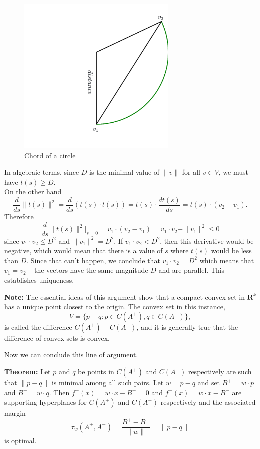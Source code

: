 \documentclass[
]{article}
\begin{document}
\begin{figure}
\hypertarget{fig:chord}{%
\centering
\includegraphics[width=3in,height=\textheight]{../img/chord2.png}
\caption{Chord of a circle}\label{fig:chord}
}
\end{figure}

In algebraic terms, since \(D\) is the minimal value of \(\|v\|\) for
all \(v\in V\), we must have \(t(s)\ge D\).\\
On the other hand \[
\frac{d}{ds}\|t(s)\|^2 = \frac{d}{ds}(t(s)\cdot t(s)) =t(s)\cdot \frac{dt(s)}{ds} = t(s)\cdot(v_2-v_1).
\] Therefore \[
\frac{d}{ds}\|t(s)\|^2|_{s=0} = v_{1}\cdot(v_{2}-v_{1})=v_{1}\cdot v_{2}-\|v_{1}\|^2\le 0
\] since \(v_{1}\cdot v_{2}\le D^{2}\) and \(\|v_{1}\|^2=D^2\). If
\(v_{1}\cdot v_{2}<D^{2}\), then this derivative would be negative,
which would mean that there is a value of \(s\) where \(t(s)\) would be
less than \(D\). Since that can't happen, we conclude that
\(v_{1}\cdot v_{2}=D^{2}\) which means that \(v_{1}=v_{2}\) -- the
vectors have the same magnitude \(D\) and are parallel. This establishes
uniqueness.

\textbf{Note:} The essential ideas of this argument show that a compact
convex set in \(\mathbf{R}^{k}\) has a unique point closest to the
origin. The convex set in this instance, \[
V=\{p-q:p\in C(A^{+}),q\in C(A^{-})\},
\] is called the difference \(C(A^{+})-C(A^{-})\), and it is generally
true that the difference of convex sets is convex.

Now we can conclude this line of argument.

\textbf{Theorem:} Let \(p\) and \(q\) be points in \(C(A^{+})\) and
\(C(A^{-})\) respectively are such that \(\|p-q\|\) is minimal among all
such pairs. Let \(w=p-q\) and set \(B^{+}=w\cdot p\) and
\(B^{-}=w\cdot q\). Then \(f^{+}(x)=w\cdot x-B^{+}=0\) and
\(f^{-}(x)=w\cdot x-B^{-}\) are supporting hyperplanes for \(C(A^{+})\)
and \(C(A^{-})\) respectively and the associated margin \[
\tau_{w}(A^{+},A^{-})=\frac{B^{+}-B^{-}}{\|w\|} = \|p-q\|
\] is optimal.
\end{document}
